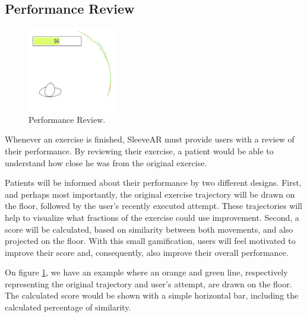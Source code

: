 \subsection{Performance Review}

\begin{figure}
    \begin{center}
        \includegraphics[width=0.35\textwidth]{imgs/performancereview.png}
    \end{center}
    \caption{Performance Review.}
    \label{fig:performancereview}
\end{figure}

Whenever an exercise is finished, SleeveAR must provide users with a review of their performance. 
By reviewing their exercise, a patient would be able to understand how close he was from the original exercise.

Patients will be informed about their performance by two different designs. 
First, and perhaps most importantly, the original exercise trajectory will be drawn on the floor, followed by the user's recently executed attempt. 
These trajectories will help to visualize what fractions of the exercise could use improvement.
Second, a score will be calculated, based on similarity between both movements, and also projected on the floor. 
With this small gamification, users will feel motivated to improve their score and, consequently, also improve their overall performance.

On figure \ref{fig:performancereview}, we have an example where an orange and green line, 
respectively representing the original trajectory and user's attempt, are drawn on the floor. 
The calculated score would be shown with a simple horizontal bar, including the calculated percentage of similarity.